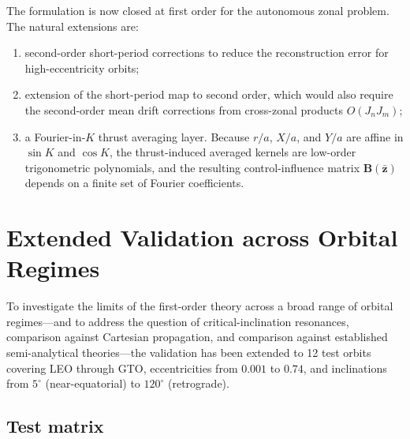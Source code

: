 \documentclass[11pt]{article}
\begin{document}
The formulation is now closed at first order for the autonomous zonal problem.
The natural extensions are:
\begin{enumerate}
    \item second-order short-period corrections to reduce the reconstruction
    error for high-eccentricity orbits;
    \item extension of the short-period map to second order, which would
    also require the second-order mean drift corrections from cross-zonal
    products $O(J_n J_m)$;
    \item a Fourier-in-$K$ thrust averaging layer. Because $r/a$, $X/a$,
    and $Y/a$ are affine in $\sin K$ and $\cos K$, the thrust-induced
    averaged kernels are low-order trigonometric polynomials, and the
    resulting control-influence matrix $\bm{B}(\bar{\bm z})$ depends on a
    finite set of Fourier coefficients.
\end{enumerate}

\appendix

\section{Extended Validation across Orbital Regimes}
\label{sec:extended_validation}

To investigate the limits of the first-order theory across a broad range of
orbital regimes---and to address the question of critical-inclination
resonances, comparison against Cartesian propagation, and comparison against
established semi-analytical theories---the validation has been extended to 12
test orbits covering LEO through GTO, eccentricities from $0.001$ to $0.74$,
and inclinations from $5^\circ$ (near-equatorial) to $120^\circ$ (retrograde).

\subsection{Test matrix}
\end{document}
